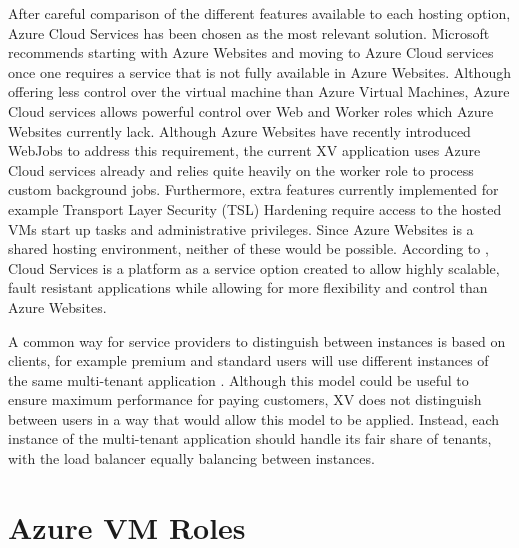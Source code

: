 After careful comparison of the different features available to each hosting option, Azure Cloud Services has been chosen as the most relevant solution. Microsoft recommends starting with Azure Websites and moving to Azure Cloud services once one requires a service that is not fully available in Azure Websites. Although offering less control over the virtual machine than Azure Virtual Machines, Azure Cloud services allows powerful control over Web and Worker roles which Azure Websites currently lack. Although Azure Websites have recently introduced WebJobs to address this requirement, the current XV application uses Azure Cloud services already and relies quite heavily on the worker role to process custom background jobs. Furthermore, extra features currently implemented for example Transport Layer Security (TSL) Hardening require access to the hosted VMs start up tasks and administrative privileges. Since Azure Websites is a shared hosting environment, neither of these would be possible.  According to \cite{Microsoft_Corporation_undated-ej}, Cloud Services is a platform as a service option created to allow highly scalable, fault resistant applications while allowing for more flexibility and control than Azure Websites.
 
A common way for service providers to distinguish between instances is based on clients, for example premium and standard users will use different instances of the same multi-tenant application \cite{Betts2012-ad}. Although this model could be useful to ensure maximum performance for paying customers, XV does not distinguish between users in a way that would allow this model to be applied. Instead, each instance of the multi-tenant application should handle its fair share of tenants, with the load balancer equally balancing between instances.

\section{Azure VM Roles}

